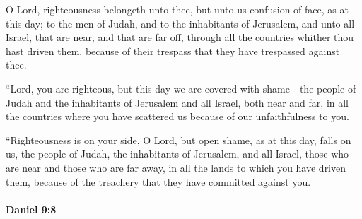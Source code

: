 			\begin{versebox}
					\item[BHS] 
					\item[LXX] 
					\item[ASV] O Lord, righteousness belongeth unto thee, but unto us confusion of face, as at this day; to the men of Judah, and to the inhabitants of Jerusalem, and unto all Israel, that are near, and that are far off, through all the countries whither thou hast driven them, because of their trespass that they have trespassed against thee.
					\item[NIV] “Lord, you are righteous, but this day we are covered with shame—the people of Judah and the inhabitants of Jerusalem and all Israel, both near and far, in all the countries where you have scattered us because of our unfaithfulness to you.
					\item[NRSV] “Righteousness is on your side, O Lord, but open shame, as at this day, falls on us, the people of Judah, the inhabitants of Jerusalem, and all Israel, those who are near and those who are far away, in all the lands to which you have driven them, because of the treachery that they have committed against you.
			\end{versebox}

		\paragraph{Daniel 9:8} %
			\label{DANIEL-9-8}

